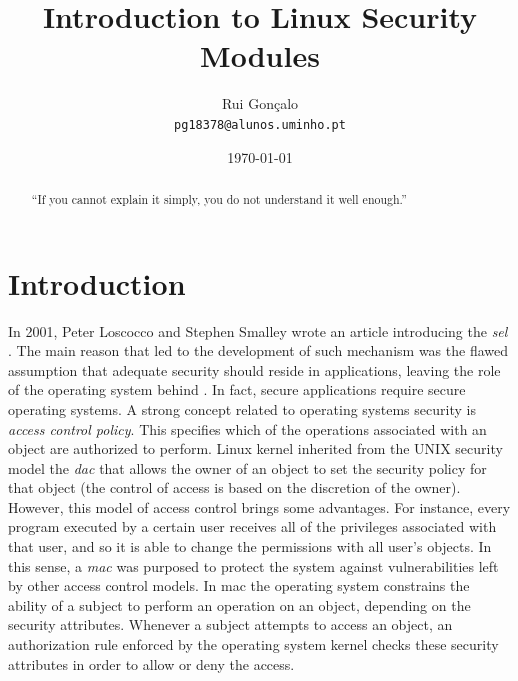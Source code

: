 \documentclass[]{article}
\begin{document}
\title{Introduction to Linux Security Modules}
\author{Rui Gonçalo
        \\{\scriptsize \texttt{pg18378@alunos.uminho.pt}}
       }
\date{\today}
\maketitle

\begin{abstract}
``If you cannot explain it simply, you do not understand it well enough.''
\end{abstract}


\section{Introduction}

In 2001, Peter Loscocco and Stephen Smalley wrote an article introducing the \textit{\gls{sel}} \cite{LS01}. The main reason that led to the development of such mechanism was the flawed assumption that adequate security should reside in applications, leaving the role of the operating system behind \cite{LSMTTF98}. In fact, secure applications require secure operating systems. A strong concept related to operating systems security is \textit{access control policy}. This specifies which of the operations associated with an object are authorized to perform. Linux kernel inherited from the UNIX security model the \textit{\gls{dac}} that allows the owner of an object to set the security policy for that object (the control of access is based on the discretion of the owner). However, this model of access control brings some advantages. For instance, every program executed by a certain user receives all of the privileges associated with that user, and so it is able to change the permissions with all user's objects. In this sense, a \textit{\gls{mac}} was purposed to protect the system against vulnerabilities left by other access control models. In \gls{mac} the operating system constrains the ability of a subject to perform an operation on an object, depending on the security attributes. Whenever a subject attempts to access an object, an authorization rule enforced by the operating system kernel checks these security attributes in order to allow or deny the access.\\
\end{document}
